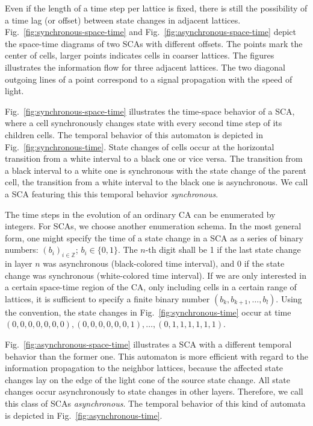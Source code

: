 \documentclass[pre,amssymb,showpacs,showkeys,preprint]{revtex4}
\begin{document}
Even if the length of a time step per lattice is fixed, there is still the possibility
of a time lag (or offset) between state changes in adjacent lattices.
Fig.~\ref{fig:synchronous-space-time} and Fig.~\ref{fig:asynchronous-space-time} depict
the space-time diagrams of two SCAs with different offsets.
The points mark the center of cells, larger points indicates cells in coarser lattices.
The figures illustrates the information flow for three adjacent lattices.
The two diagonal outgoing lines of a point correspond to a signal propagation with the
speed of light.

Fig.~\ref{fig:synchronous-space-time} illustrates the time-space behavior of a SCA,
where a cell synchronously changes state with every second time step of its children cells.
The temporal behavior of this automaton is depicted in Fig.~\ref{fig:synchronous-time}.
State changes of cells occur at the horizontal transition from a white interval to a black one
or vice versa.
The transition from a black interval to a white one is synchronous with the state change of the
parent cell, the transition from a white interval to the black one is asynchronous.
We call a SCA featuring this this temporal behavior \emph{synchronous}.

The time steps in the evolution of an ordinary CA can be enumerated by integers.
For SCAs, we choose another enumeration schema.
In the most general form, one might specify the time of a state change
in a SCA as a series of binary
numbers: $(b_i)_{i \in \mathbb{Z}}$; $b_i \in \{0,1\}$.
The $n$-th digit shall be 1 if the last state change in layer $n$ was asynchronous
(black-colored time interval), and $0$ if the state change was synchronous
(white-colored time interval).
If we are only interested in a certain space-time region of the CA, only including cells in a
certain range of lattices, it is sufficient to specify a finite binary number
$(b_k, b_{k+1}, \ldots, b_l)$.
Using the convention, the state changes in Fig.~\ref{fig:synchronous-time} occur at
time $(0,0,0,0,0,0,0), (0,0,0,0,0,0,1), \ldots, (0,1,1,1,1,1,1)$.

Fig.~\ref{fig:asynchronous-space-time} illustrates a SCA with a
different temporal behavior than the former one.
This automaton is more efficient with regard to the information propagation to the neighbor lattices,
because the affected state changes lay on the edge of the light cone of the source state change.
All state changes occur asynchronously to state changes in other layers.
Therefore, we call this class of SCAs \emph{asynchronous}.
The temporal behavior of this kind of automata is depicted in Fig.~\ref{fig:asynchronous-time}.
\end{document}
